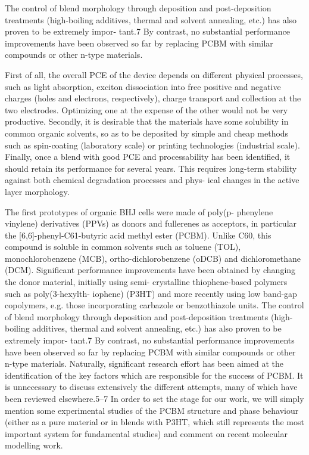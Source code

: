 \documentclass[aps,prb,onecolumn,preprint,superscriptaddress,footinbib,amsmath,amssymb,floatfix]{revtex4}
\begin{document}
The control of blend morphology through deposition and
post-deposition treatments (high-boiling additives, thermal and
solvent annealing, etc.) has also proven to be extremely impor-
tant.7 By contrast, no substantial performance improvements
have been observed so far by replacing PCBM with similar
compounds or other n-type materials.



First of all, the
overall PCE of the device depends on different physical
processes, such as light absorption, exciton dissociation into free
positive and negative charges (holes and electrons, respectively),
charge transport and collection at the two electrodes. Optimizing
one at the expense of the other would not be very productive.
Secondly, it is desirable that the materials have some solubility in
common organic solvents, so as to be deposited by simple and
cheap methods such as spin-coating (laboratory scale) or
printing technologies (industrial scale). Finally, once a blend
with good PCE and processability has been identified, it should
retain its performance for several years. This requires long-term
stability against both chemical degradation processes and phys-
ical changes in the active layer morphology.

The first prototypes of organic BHJ cells were made of poly(p-
phenylene vinylene) derivatives (PPVs) as donors and fullerenes
as acceptors, in particular the [6,6]-phenyl-C61-butyric acid
methyl ester (PCBM). Unlike C60, this compound is soluble in
common solvents such as toluene (TOL), monochlorobenzene
(MCB), ortho-dichlorobenzene (oDCB) and dichloromethane
(DCM). Significant performance improvements have been
obtained by changing the donor material, initially using semi-
crystalline thiophene-based polymers such as poly(3-hexylth-
iophene) (P3HT) and more recently using low band-gap
copolymers, e.g. those incorporating carbazole or benzothiazole
units. The control of blend morphology through deposition and
post-deposition treatments (high-boiling additives, thermal and
solvent annealing, etc.) has also proven to be extremely impor-
tant.7 By contrast, no substantial performance improvements
have been observed so far by replacing PCBM with similar
compounds or other n-type materials. Naturally, significant
research effort has been aimed at the identification of the key
factors which are responsible for the success of PCBM. It is
unnecessary to discuss extensively the different attempts, many
of which have been reviewed elsewhere.5–7 In order to set the
stage for our work, we will simply mention some experimental
studies of the PCBM structure and phase behaviour (either as
a pure material or in blends with P3HT, which still represents the
most important system for fundamental studies) and comment
on recent molecular modelling work.
\end{document}
